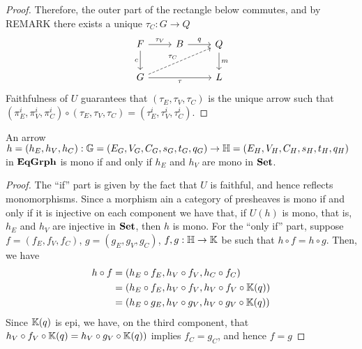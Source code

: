 \begin{proof}
    Therefore, the outer part of the rectangle below commutes, and by REMARK  there exists a unique $\tau_C: G \to Q$
    \[
        \begin{tikzcd}
            F \arrow[r, "{\tau_V}"] \arrow[d, "c"swap] & B \arrow[r, "q"] & Q \arrow[d, "m"] \\
            G \arrow[urr, dashed, "{\tau_C}"] \arrow[rr, "{\tau}"swap] & & L
        \end{tikzcd}
    \]
     Faithfulness of $U$ guarantees that $(\tau_E, \tau_V, \tau_C)$ is the unique arrow such that $(\pi_E^i, \pi_V^i, \pi_C^i) \circ (\tau_E, \tau_V, \tau_C) = (\tau_E^i, \tau_V^i, \tau_C^i)$.
\end{proof}

\begin{cor}\label{cor:mono_in_EqGrph}
    An arrow $h = (h_E, h_V, h_C): \mathbb{G} = (E_G, V_G, C_G, s_G, t_G, q_G) \to \mathbb{H} = (E_H, V_H, C_H, s_H, t_H, q_H)$ in $\mathbf{EqGrph}$ is mono if and only if $h_E$ and $h_V$ are mono in $\mathbf{Set}$.
\end{cor}

\begin{proof}
    The ``if'' part is given by the fact that $U$ is faithful, and hence reflects monomorphisms. Since a morphism ain a category of presheaves is mono if and only if it is injective on each component 
    we have that, if  $U(h)$ is mono, that is, $h_E$ and $h_V$ are injective in $\mathbf{Set}$, then $h$ is mono.
    For the ``only if'' part, suppose $f = (f_E, f_V, f_C)$, $g=(g_E, g_V, g_C)$, $f, g : \mathbb{H \to K}$ be such that $h \circ f = h \circ g$. Then, we have
    \begin{align*}
        h \circ f   &= (h_E \circ f_E, h_V \circ f_V, h_C \circ f_C) \\
                    &= (h_E \circ f_E, h_V \circ f_V, h_V \circ f_V \circ \mathbb{K}(q)) \\
                    &= (h_E \circ g_E, h_V \circ g_V, h_V \circ g_V \circ \mathbb{K}(q))
    \end{align*}    
    Since $\mathbb{K}(q)$ is epi, we have, on the third component, that $h_V \circ f_V \circ \mathbb{K}(q) = h_V \circ g_V \circ \mathbb{K}(q))$ implies $f_C = g_C$, and hence $f = g$    
\end{proof}

